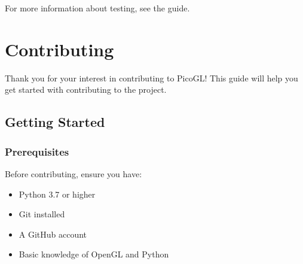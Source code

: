 \documentclass[a4paper,10pt,english,openany,oneside]{sphinxmanual}
\begin{document}
\sphinxAtStartPar
For more information about testing, see the {\hyperref[\detokenize{development::doc}]{}} guide.

\sphinxstepscope


\section{Contributing}
\label{\detokenize{contributing:contributing}}\label{\detokenize{contributing::doc}}
\sphinxAtStartPar
Thank you for your interest in contributing to PicoGL! This guide will help you get started with contributing to the project.


\subsection{Getting Started}
\label{\detokenize{contributing:getting-started}}

\subsubsection{Prerequisites}
\label{\detokenize{contributing:prerequisites}}
\sphinxAtStartPar
Before contributing, ensure you have:
\begin{itemize}
\item {} 
\sphinxAtStartPar
Python 3.7 or higher

\item {} 
\sphinxAtStartPar
Git installed

\item {} 
\sphinxAtStartPar
A GitHub account

\item {} 
\sphinxAtStartPar
Basic knowledge of OpenGL and Python

\end{itemize}
\end{document}

